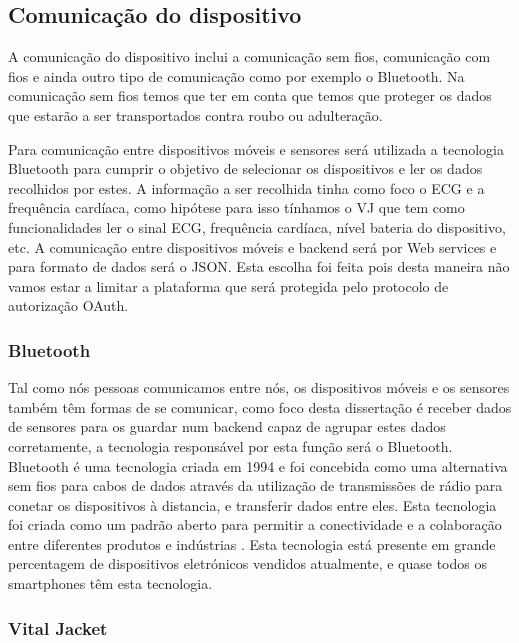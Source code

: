 \subsection{Comunicação do dispositivo}


A comunicação do dispositivo inclui a comunicação sem fios, comunicação com fios e ainda outro tipo de comunicação como por exemplo o Bluetooth. Na comunicação sem fios temos que ter em conta que temos que proteger os dados que estarão a ser transportados contra roubo ou adulteração. 
\par
Para comunicação entre dispositivos móveis e sensores será utilizada a tecnologia Bluetooth para cumprir o objetivo de selecionar os dispositivos e ler os dados recolhidos por estes.
A informação a ser recolhida tinha como foco o \gls{ECG} e a frequência cardíaca, como hipótese para isso tínhamos o \gls{VJ} que tem como funcionalidades ler o sinal \gls{ECG}, frequência cardíaca, nível bateria do dispositivo, etc.
A comunicação entre dispositivos móveis e backend será por Web services e para formato de dados será o JSON. Esta escolha foi feita pois desta maneira não vamos estar a limitar a plataforma que será protegida pelo protocolo de autorização OAuth. 

\subsubsection{Bluetooth}

Tal como nós pessoas comunicamos entre nós, os dispositivos móveis e os sensores também têm formas de se comunicar, como foco desta dissertação é receber dados de sensores para os guardar num backend capaz de agrupar estes dados corretamente, a tecnologia responsável por esta função será o Bluetooth.
Bluetooth é uma tecnologia criada em 1994 e foi concebida como uma alternativa sem fios para cabos de dados através da utilização de transmissões de rádio para conetar os dispositivos à distancia, e transferir dados entre eles. Esta tecnologia foi criada como um padrão aberto para permitir a conectividade e a colaboração entre diferentes produtos e indústrias \cite{bluetooth}.
Esta tecnologia está presente em grande percentagem de dispositivos eletrónicos vendidos atualmente, e quase todos os smartphones têm esta tecnologia.

\subsubsection{Vital Jacket}

